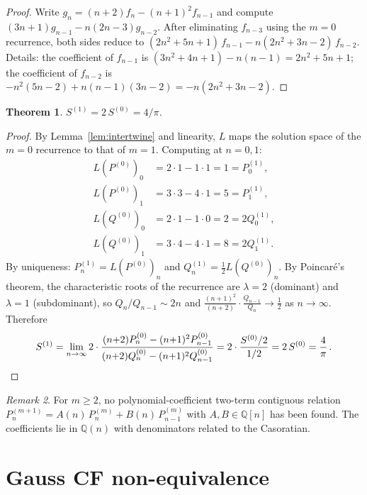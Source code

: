 \documentclass[11pt]{article}
\newtheorem{theorem}{Theorem}[section]
\theoremstyle{definition}
\theoremstyle{remark}
\newtheorem{remark}[theorem]{Remark}
\begin{document}
\begin{proof}
Write $g_n = (n{+}2)f_n - (n{+}1)^2 f_{n-1}$ and compute
$(3n{+}1)g_{n-1} - n(2n{-}3)g_{n-2}$.
After eliminating $f_{n-3}$ using the $m{=}0$ recurrence,
both sides reduce to
$(2n^2{+}5n{+}1)\,f_{n-1} - n(2n^2{+}3n{-}2)\,f_{n-2}$.
Details: the coefficient of $f_{n-1}$ is
$(3n^2{+}4n{+}1) - n(n{-}1) = 2n^2{+}5n{+}1$;
the coefficient of $f_{n-2}$ is
$-n^2(5n{-}2) + n(n{-}1)(3n{-}2) = -n(2n^2{+}3n{-}2)$.
\end{proof}

\begin{theorem}\label{thm:shift}
$S^{(1)} = 2\,S^{(0)} = 4/\pi$.
\end{theorem}

\begin{proof}
By Lemma~\ref{lem:intertwine} and linearity,
$L$ maps the solution space of the $m{=}0$ recurrence
to that of $m{=}1$.  Computing at $n=0,1$:
\begin{align*}
  L(P^{(0)})_0 &= 2\cdot1 - 1\cdot1 = 1 = P_0^{(1)},\\
  L(P^{(0)})_1 &= 3\cdot3 - 4\cdot1 = 5 = P_1^{(1)},\\
  L(Q^{(0)})_0 &= 2\cdot1 - 1\cdot0 = 2 = 2Q_0^{(1)},\\
  L(Q^{(0)})_1 &= 3\cdot4 - 4\cdot1 = 8 = 2Q_1^{(1)}.
\end{align*}
By uniqueness: $P_n^{(1)} = L(P^{(0)})_n$ and
$Q_n^{(1)} = \tfrac{1}{2}L(Q^{(0)})_n$.
By Poincar\'e's theorem, the characteristic roots of the
recurrence are $\lambda=2$ (dominant) and $\lambda=1$ (subdominant),
so $Q_n/Q_{n-1} \sim 2n$ and
$\frac{(n+1)^2}{(n+2)} \cdot \frac{Q_{n-1}}{Q_n} \to \frac{1}{2}$
as $n \to \infty$.
Therefore
\[
  S^{(1)} = \lim_{n\to\infty}
  2\cdot\frac{(n{+}2)P_n^{(0)} - (n{+}1)^2 P_{n-1}^{(0)}}
             {(n{+}2)Q_n^{(0)} - (n{+}1)^2 Q_{n-1}^{(0)}}
  = 2\cdot\frac{S^{(0)}/2}{1/2}
  = 2\,S^{(0)} = \frac{4}{\pi}\,.\qedhere
\]
\end{proof}

\begin{remark}
For $m \geq 2$, no polynomial-coefficient two-term contiguous
relation $P_n^{(m+1)} = A(n)\,P_n^{(m)} + B(n)\,P_{n-1}^{(m)}$
with $A,B \in \mathbb{Q}[n]$ has been found.
The coefficients lie in $\mathbb{Q}(n)$ with
denominators related to the Casoratian.
\end{remark}


\section{Gauss CF non-equivalence}\label{sec:gauss}
\end{document}
